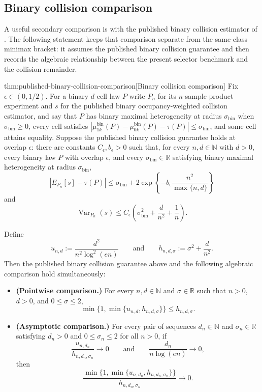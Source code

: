 \subsection{Binary collision comparison}

A useful secondary comparison is with the published binary collision estimator of \citet{ZengBalakrishnanHanKennedy2024}. The following statement keeps that comparison separate from the same-class minimax bracket: it assumes the published binary collision guarantee and then records the algebraic relationship between the present selector benchmark and the collision remainder.

\begin{propositionv}{thm:published-binary-collision-comparison}[Binary collision comparison]
Fix \(\epsilon\in(0,1/2)\).  For a binary \(d\)-cell law \(P\) write \(P_n\) for its \(n\)-sample product experiment and \(s\) for the published binary occupancy-weighted collision estimator, and say that \(P\) has binary maximal heterogeneity at radius \(\sigma_{\mathrm{bin}}\) when \(\sigma_{\mathrm{bin}}\ge0\), every cell satisfies \(\left|\mu_{1k}^{\mathrm{bin}}(P)-\mu_{0k}^{\mathrm{bin}}(P)-\tau(P)\right|\le\sigma_{\mathrm{bin}}\), and some cell attains equality.  Suppose the published binary collision guarantee holds at overlap \(\epsilon\): there are constants \(C_\epsilon,b_\epsilon>0\) such that, for every \(n,d\in\mathbb N\) with \(d>0\), every binary law \(P\) with overlap \(\epsilon\), and every \(\sigma_{\mathrm{bin}}\in\mathbb R\) satisfying binary maximal heterogeneity at radius \(\sigma_{\mathrm{bin}}\),
\[
\left|
E_{P_n}[s]-\tau(P)
\right|
\le
\sigma_{\mathrm{bin}}
+
2\exp\left\{-b_\epsilon\frac{n^2}{\max\{n,d\}}\right\}
\]
and
\[
\operatorname{Var}_{P_n}(s)
\le
C_\epsilon\left(\sigma_{\mathrm{bin}}^2+\frac{d}{n^2}+\frac1n\right).
\]

Define
\[
u_{n,d}:=\frac{d^2}{n^2\log^2(en)}
\qquad\text{and}\qquad
h_{n,d,\sigma}:=\sigma^2+\frac{d}{n^2}.
\]
Then the published binary collision guarantee above and the following algebraic comparison hold simultaneously:
\begin{itemize}
\item \textbf{(Pointwise comparison.)} For every \(n,d\in\mathbb N\) and \(\sigma\in\mathbb R\) such that \(n>0\), \(d>0\), and \(0\le \sigma\le 2\),
\[
\min\{1,\min\{u_{n,d},h_{n,d,\sigma}\}\}\le h_{n,d,\sigma}.
\]
\item \textbf{(Asymptotic comparison.)} For every pair of sequences \(d_n\in\mathbb N\) and \(\sigma_n\in\mathbb R\) satisfying \(d_n>0\) and \(0\le\sigma_n\le2\) for all \(n>0\), if
\[
\frac{u_{n,d_n}}{h_{n,d_n,\sigma_n}}\to0
\qquad\text{and}\qquad
\frac{d_n}{n\log(en)}\to0,
\]
then
\[
\frac{\min\{1,\min\{u_{n,d_n},h_{n,d_n,\sigma_n}\}\}}
{h_{n,d_n,\sigma_n}}
\to0 .
\]
\end{itemize}
\end{propositionv}

